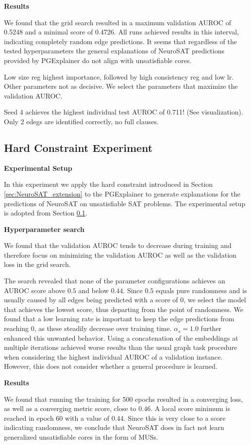 \textbf{Results}\par
We found that the grid search resulted in a maximum validation AUROC of 0.5248 and a minimal score of 0.4726. All runs achieved results in this interval, indicating completely random edge predictions. It seems that regardless of the tested hyperparameters the general explanations of NeuroSAT predictions provided by PGExplainer do not align with unsatisfiable cores. 

Low size reg highest importance, followed by high consistency reg and low lr. Other parameters not as decisive. We select the parameters that maximize the validation AUROC.

Seed 4 achieves the highest individual test AUROC of 0.711! (See visualization). Only 2 edegs are identified correctly, no full clauses.


\subsection{Hard Constraint Experiment}
\textbf{Experimental Setup}\par
In this experiment we apply the hard constraint introduced in Section \ref{sec:NeuroSAT_extension} to the PGExplainer to generate explanations for the predictions of NeuroSAT on unsatisfiable SAT problems. The experimental setup is adopted from Section \ref{}. \bigskip

\textbf{Hyperparameter search}\par
We found that the validation AUROC tends to decrease during training and therefore focus on minimizing the validation AUROC as well as the validation loss in the grid search.

The search revealed that none of the parameter configurations achieves an AUROC score above $0.5$ and below $0.44$. Since $0.5$ equals pure randomness and is usually caused by all edges being predicted with a score of $0$, we select the model that achieves the lowest score, thus departing from the point of randomness. We found that a low learning rate is important to keep the edge predictions from reaching 0, as these steadily decrease over training time. $\alpha_s=1.0$ further enhanced this unwanted behavior. Using a concatenation of the embeddings at multiple iterations achieved worse results than the usual graph task procedure when considering the highest individual AUROC of a validation instance. However, this does not consider whether a general procedure is learned. \bigskip

\textbf{Results}\par
We found that running the training for 500 epochs resulted in a converging loss, as well as a converging metric score, close to $0.46$. A local score minimum is reached in epoch 60 with a value of $0.44$. Since this is very close to a score indicating randomness, we conclude that NeuroSAT does in fact not learn generalized unsatisfiable cores in the form of MUSs.


